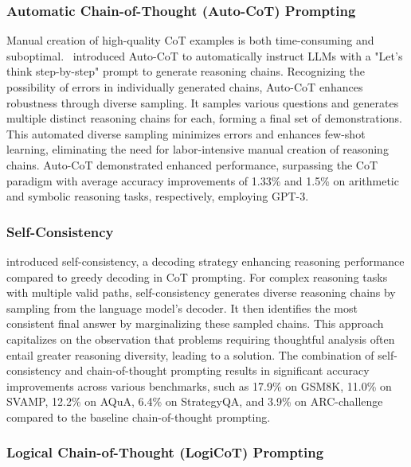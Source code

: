 \documentclass{article}
\begin{document}
\subsubsection{Automatic Chain-of-Thought (Auto-CoT) Prompting}
\label{auto-cot}
Manual creation of high-quality CoT examples is both time-consuming and suboptimal.~\cite{zhang2022automatic} introduced Auto-CoT to automatically instruct LLMs with a "Let's think step-by-step" prompt to generate reasoning chains. Recognizing the possibility of errors in individually generated chains, Auto-CoT enhances robustness through diverse sampling. It samples various questions and generates multiple distinct reasoning chains for each, forming a final set of demonstrations. This automated diverse sampling minimizes errors and enhances few-shot learning, eliminating the need for labor-intensive manual creation of reasoning chains. Auto-CoT demonstrated enhanced performance, surpassing the CoT paradigm with average accuracy improvements of 1.33\% and 1.5\% on arithmetic and symbolic reasoning tasks, respectively, employing GPT-3.


\subsubsection{Self-Consistency}
\label{selfcon}
\cite{wang2022self} introduced self-consistency, a decoding strategy enhancing reasoning performance compared to greedy decoding in CoT prompting. For complex reasoning tasks with multiple valid paths, self-consistency generates diverse reasoning chains by sampling from the language model's decoder. It then identifies the most consistent final answer by marginalizing these sampled chains. This approach capitalizes on the observation that problems requiring thoughtful analysis often entail greater reasoning diversity, leading to a solution. The combination of self-consistency and chain-of-thought prompting results in significant accuracy improvements across various benchmarks, such as 17.9\% on GSM8K, 11.0\% on SVAMP, 12.2\% on AQuA, 6.4\% on StrategyQA, and 3.9\% on ARC-challenge compared to the baseline chain-of-thought prompting.


\subsubsection{Logical Chain-of-Thought (LogiCoT) Prompting}
\end{document}

